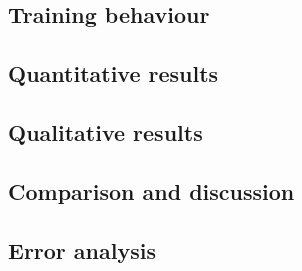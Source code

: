 
\subsection{Training behaviour}
\label{subsec:results-1}


\subsection{Quantitative results}
\label{subsec:results-2}


\subsection{Qualitative results}
\label{subsec:results-3}


\subsection{Comparison and discussion}
\label{subsec:results-4}


\subsection{Error analysis}
\label{subsec:results-5}


